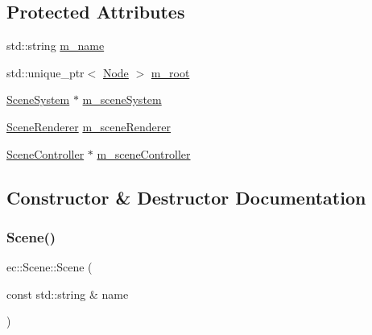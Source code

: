 \subsection*{Protected Attributes}
\begin{DoxyCompactItemize}
\item 
std\+::string \mbox{\hyperlink{classec_1_1_scene_a58a25f1f2370535750e341085ddfd95b}{m\+\_\+name}}
\item 
std\+::unique\+\_\+ptr$<$ \mbox{\hyperlink{classec_1_1_node}{Node}} $>$ \mbox{\hyperlink{classec_1_1_scene_a7b7f1f4840087d56148e4c4be5737b50}{m\+\_\+root}}
\item 
\mbox{\hyperlink{classec_1_1_scene_system}{Scene\+System}} $\ast$ \mbox{\hyperlink{classec_1_1_scene_ad63e472baf8e283c596891384ea98aad}{m\+\_\+scene\+System}}
\item 
\mbox{\hyperlink{classec_1_1_scene_renderer}{Scene\+Renderer}} \mbox{\hyperlink{classec_1_1_scene_a17a2c241cec6bda0a5895b353aa28fa7}{m\+\_\+scene\+Renderer}}
\item 
\mbox{\hyperlink{classec_1_1_scene_controller}{Scene\+Controller}} $\ast$ \mbox{\hyperlink{classec_1_1_scene_aa6a8f71066fc44162b1c80341840d5fb}{m\+\_\+scene\+Controller}}
\end{DoxyCompactItemize}


\subsection{Constructor \& Destructor Documentation}
\mbox{\label{classec_1_1_scene_ad137e70b44b44f22b3e68d50671e9989}} 
\subsubsection{\texorpdfstring{Scene()}{Scene()}}
{\footnotesize\ttfamily ec\+::\+Scene\+::\+Scene (\begin{DoxyParamCaption}\item[{const std\+::string \&}]{name }\end{DoxyParamCaption})\hspace{0.3cm}{\ttfamily [explicit]}}

\mbox{\label{classec_1_1_scene_a25e849d1bd5a9a71af922c3668115cb6}} 
